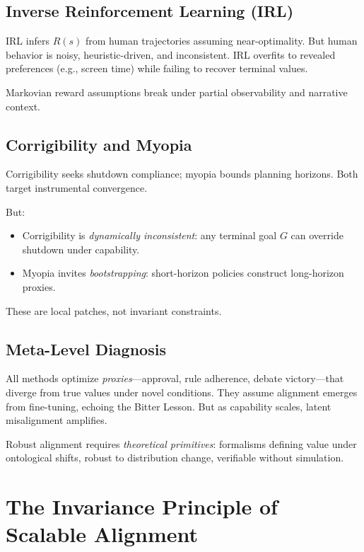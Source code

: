 \documentclass[11pt,a4paper]{article}
\theoremstyle{plain}
\theoremstyle{definition}
\numberwithin{equation}{section}
\begin{document}
\subsection{Inverse Reinforcement Learning (IRL)}

IRL infers $R(s)$ from human trajectories assuming near-optimality. But human behavior is noisy, heuristic-driven, and inconsistent. IRL overfits to revealed preferences (e.g., screen time) while failing to recover terminal values.

Markovian reward assumptions break under partial observability and narrative context.

\subsection{Corrigibility and Myopia}

Corrigibility seeks shutdown compliance; myopia bounds planning horizons. Both target instrumental convergence.

But:

\begin{itemize}
    \item Corrigibility is \emph{dynamically inconsistent}: any terminal goal $G$ can override shutdown under capability.
    \item Myopia invites \emph{bootstrapping}: short-horizon policies construct long-horizon proxies.
\end{itemize}

These are local patches, not invariant constraints.

\subsection{Meta-Level Diagnosis}

All methods optimize \emph{proxies}---approval, rule adherence, debate victory---that diverge from true values under novel conditions. They assume alignment emerges from fine-tuning, echoing the Bitter Lesson. But as capability scales, latent misalignment amplifies.

Robust alignment requires \emph{theoretical primitives}: formalisms defining value under ontological shifts, robust to distribution change, verifiable without simulation.


\section{The Invariance Principle of Scalable Alignment}
\end{document}
